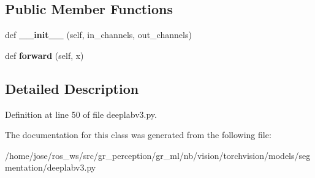 \subsection*{Public Member Functions}
\begin{DoxyCompactItemize}
\item 
\mbox{\label{classtorchvision_1_1models_1_1segmentation_1_1deeplabv3_1_1ASPPPooling_add161986b22a058aee93d1ebce97a83c}} 
def {\bfseries \+\_\+\+\_\+init\+\_\+\+\_\+} (self, in\+\_\+channels, out\+\_\+channels)
\item 
\mbox{\label{classtorchvision_1_1models_1_1segmentation_1_1deeplabv3_1_1ASPPPooling_a16afde11dfcaa0aa09979e2bee6ba1e0}} 
def {\bfseries forward} (self, x)
\end{DoxyCompactItemize}


\subsection{Detailed Description}


Definition at line 50 of file deeplabv3.\+py.



The documentation for this class was generated from the following file\+:\begin{DoxyCompactItemize}
\item 
/home/jose/ros\+\_\+ws/src/gr\+\_\+perception/gr\+\_\+ml/nb/vision/torchvision/models/segmentation/deeplabv3.\+py\end{DoxyCompactItemize}

